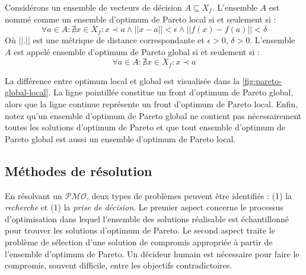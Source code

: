\begin{definition}
 Considérons un ensemble de vecteurs de décision $A \subseteq X_f$.
 L'ensemble $A$ est nommé comme un ensemble d'optimum de Pareto local si et seulement si :
 \begin{equation}
  \forall a \in A: \nexists x \in X_f : x \prec a \wedge ||x - a|| < \epsilon \wedge ||f(x) - f(a) || < \delta
 \end{equation}
 Où $|| . ||$ est une métrique de distance correspondante et $ \epsilon > 0$, $ \delta > 0$.
 L'ensemble $A$ est appelé ensemble d'optimum de Pareto global si et seulement si :
 \begin{equation}
  \forall a \in A: \nexists x \in X_f : x \prec a
 \end{equation}
\end{definition}
La différence entre optimum local et global est visualisée dans la \ref{fig:pareto-global-local}. La ligne pointillée constitue un front d'optimum de Pareto global, alors que la ligne continue représente un front d'optimum de Pareto local. Enfin, notez qu'un ensemble d'optimum de Pareto global ne contient pas nécessairement toutes les solutions d'optimum de Pareto et que tout ensemble d'optimum de Pareto global est aussi un ensemble d'optimum de Pareto local.

\subsection{Méthodes de résolution}
En résolvant un $\mathcal{PMO}$, deux types de problèmes peuvent être identifiés \cite{Branke08} : (1) la \textit{recherche} et (1) la \textit{prise de décision}. Le premier aspect concerne le processus d'optimisation dans lequel l'ensemble des solutions réalisable est échantillonné pour trouver les solutions d'optimum de Pareto. Le second aspect traite le problème de sélection d'une solution de compromis appropriée à partir de l'ensemble d'optimum de Pareto. Un décideur humain est nécessaire pour faire le compromis, souvent difficile, entre les objectifs contradictoires.

